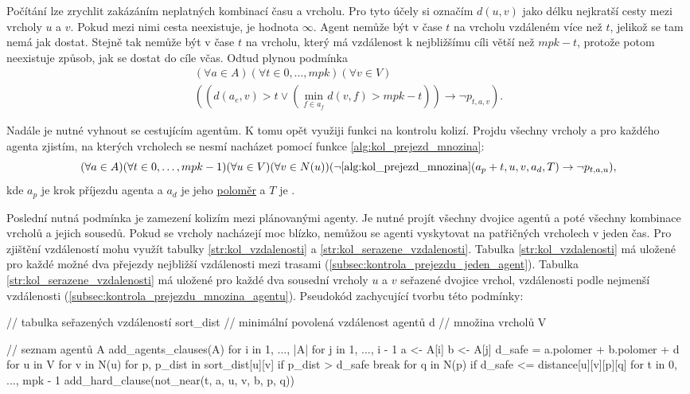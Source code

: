 Počítání lze zrychlit zakázáním neplatných kombinací času a vrcholu.
Pro tyto účely si označím $d(u, v)$ jako délku nejkratší cesty mezi vrcholy $u$ a $v$.
Pokud mezi nimi cesta neexistuje, je hodnota $\infty$.
Agent nemůže být v čase $t$ na vrcholu vzdáleném více než $t$, jelikož se tam nemá jak dostat.
Stejně tak nemůže být v čase $t$ na vrcholu, který má vzdálenost k nejbližšímu cíli větší než $mpk - t$,
protože potom neexistuje způsob, jak se dostat do cíle včas.
Odtud plynou podmínka
\begin{gather*}
(\forall a \in A)(\forall t \in {0, \dots, mpk})(\forall v \in V)
	\\
	((d(a_e, v) > t \vee (\min_{f \in a_f} d(v, f) > mpk - t)) \rightarrow \neg p_{t, a, v}).
\end{gather*}

Nadále je nutné vyhnout se cestujícím agentům.
K tomu opět využiji funkci na kontrolu kolizí.
Projdu všechny vrcholy a pro každého agenta zjistím,
na kterých vrcholech se nesmí nacházet pomocí funkce \ref{alg:kol_prejezd_mnozina}:
\[
	(\forall a \in A)(\forall t \in {0, \dots, mpk - 1})(\forall u \in V)(\forall v \in N(u))
	(\neg \ref{alg:kol_prejezd_mnozina}(a_p + t, u, v, a_d, T) \rightarrow \neg p_{t, a, u}),
\]
kde $a_p$ je krok příjezdu agenta a $a_d$ je jeho \hyperref[par:polomer_agenta]{poloměr}
a $T$ je .

Poslední nutná podmínka je zamezení kolizím mezi plánovanými agenty.
Je nutné projít všechny dvojice agentů a poté všechny kombinace vrcholů a jejich sousedů.
Pokud se vrcholy nacházejí moc blízko, nemůžou se agenti vyskytovat na patřičných vrcholech v jeden čas.
Pro zjištění vzdáleností mohu využít tabulky \ref{str:kol_vzdalenosti} a \ref{str:kol_serazene_vzdalenosti}.
Tabulka \ref{str:kol_vzdalenosti} má uložené pro každé možné dva přejezdy nejbližší vzdálenosti mezi trasami
(\ref{subsec:kontrola_prejezdu_jeden_agent}).
Tabulka \ref{str:kol_serazene_vzdalenosti} má uložené pro každé dva sousední vrcholy $u$ a $v$
seřazené dvojice vrchol, vzdálenosti podle nejmenší vzdálenosti (\ref{subsec:kontrola_prejezdu_mnozina_agentu}).
Pseudokód zachycující tvorbu této podmínky:

\begin{code}[fontsize=\footnotesize]
// tabulka seřazených vzdáleností sort_dist
// minimální povolená vzdálenost agentů d
// množina vrcholů V

// seznam agentů A
add_agents_clauses(A)
  for i in 1, ..., |A|
    for j in 1, ..., i - 1
      a <- A[i]
      b <- A[j]
      d_safe = a.polomer + b.polomer + d
      for u in V
        for v in N(u)
          for p, p_dist in sort_dist[u][v]
            if p_dist > d_safe
              break
            for q in N(p)
              if d_safe <= distance[u][v][p][q]
                for t in 0, ..., mpk - 1
                  add_hard_clause(not_near(t, a, u, v, b, p, q))
\end{code}

